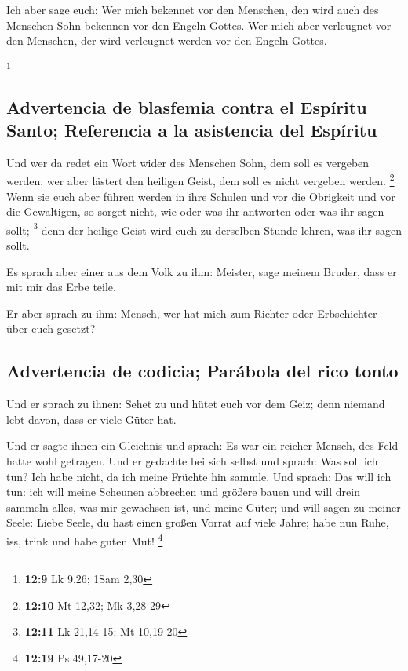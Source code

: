  Ich aber sage euch: Wer mich bekennet vor den Menschen,
den wird auch des Menschen Sohn bekennen vor den Engeln Gottes.
 Wer mich aber verleugnet vor den Menschen, der wird
verleugnet werden vor den Engeln Gottes.

\footnote{\textbf{12:9} Lk 9,26; 1Sam 2,30}

\hypertarget{advertencia-de-blasfemia-contra-el-espuxedritu-santo-referencia-a-la-asistencia-del-espuxedritu}{%
\subsection{Advertencia de blasfemia contra el Espíritu Santo;
Referencia a la asistencia del
Espíritu}\label{advertencia-de-blasfemia-contra-el-espuxedritu-santo-referencia-a-la-asistencia-del-espuxedritu}}

 Und wer da redet ein Wort wider des Menschen Sohn, dem
soll es vergeben werden; wer aber lästert den heiligen Geist, dem soll
es nicht vergeben werden. \footnote{\textbf{12:10} Mt 12,32; Mk 3,28-29}
 Wenn sie euch aber führen werden in ihre Schulen und vor
die Obrigkeit und vor die Gewaltigen, so sorget nicht, wie oder was ihr
antworten oder was ihr sagen sollt; \footnote{\textbf{12:11} Lk
  21,14-15; Mt 10,19-20}  denn der heilige Geist wird
euch zu derselben Stunde lehren, was ihr sagen sollt.

 Es sprach aber einer aus dem Volk zu ihm: Meister, sage
meinem Bruder, dass er mit mir das Erbe teile.

 Er aber sprach zu ihm: Mensch, wer hat mich zum Richter
oder Erbschichter über euch gesetzt?

\hypertarget{advertencia-de-codicia-paruxe1bola-del-rico-tonto}{%
\subsection{Advertencia de codicia; Parábola del rico
tonto}\label{advertencia-de-codicia-paruxe1bola-del-rico-tonto}}

 Und er sprach zu ihnen: Sehet zu und hütet euch vor dem
Geiz; denn niemand lebt davon, dass er viele Güter hat.

 Und er sagte ihnen ein Gleichnis und sprach: Es war ein
reicher Mensch, des Feld hatte wohl getragen.  Und er
gedachte bei sich selbst und sprach: Was soll ich tun? Ich habe nicht,
da ich meine Früchte hin sammle.  Und sprach: Das will
ich tun: ich will meine Scheunen abbrechen und größere bauen und will
drein sammeln alles, was mir gewachsen ist, und meine Güter;
 und will sagen zu meiner Seele: Liebe Seele, du hast
einen großen Vorrat auf viele Jahre; habe nun Ruhe, iss, trink und habe
guten Mut! \footnote{\textbf{12:19} Ps 49,17-20}


